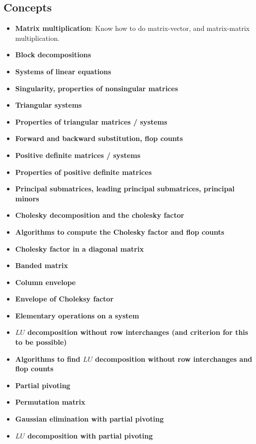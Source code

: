 \documentclass{report}
\begin{document}
    \subsection{Concepts}
    \begin{itemize}
        \item \textbf{Matrix multiplication}: Know how to do matrix-vector, and matrix-matrix multiplication.
        \item \textbf{Block decompositions}
        \item \textbf{Systems of linear equations}
        \item \textbf{Singularity, properties of nonsingular matrices}
        \item \textbf{Triangular systems}
        \item \textbf{Properties of triangular matrices / systems}
        \item \textbf{Forward and backward substitution, flop counts}
        \item \textbf{Positive definite matrices / systems}
        \item \textbf{Properties of positive definite matrices}
        \item \textbf{Principal submatrices, leading principal submatrices, principal minors}
        \item \textbf{Cholesky decomposition and the cholesky factor}
        \item \textbf{Algorithms to compute the Cholesky factor and flop counts}
        \item \textbf{Cholesky factor in a diagonal matrix}
        \item \textbf{Banded matrix}
        \item \textbf{Column envelope}
        \item \textbf{Envelope of Choleksy factor}
        \item \textbf{Elementary operations on a system}
        \item \textbf{$LU$ decomposition without row interchanges (and criterion for this to be possible)}
        \item \textbf{Algorithms to find $LU$ decomposition without row interchanges and flop counts}
        \item \textbf{Partial pivoting}
        \item \textbf{Permutation matrix}
        \item \textbf{Gaussian elimination with partial pivoting}
        \item \textbf{$LU$ decomposition with partial pivoting}

    \end{itemize}
\end{document}
